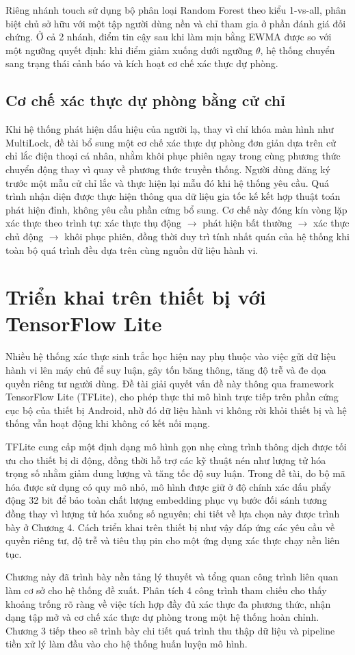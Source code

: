 \documentclass[../DoAn.tex]{subfiles}
\begin{document}
Riêng nhánh touch sử dụng bộ phân loại Random Forest theo kiểu 1-vs-all, phân biệt chủ sở hữu với một tập người dùng nền và chỉ tham gia ở phần đánh giá đối chứng. Ở cả 2 nhánh, điểm tin cậy sau khi làm mịn bằng EWMA được so với một ngưỡng quyết định: khi điểm giảm xuống dưới ngưỡng $\theta$, hệ thống chuyển sang trạng thái cảnh báo và kích hoạt cơ chế xác thực dự phòng.

\subsection{Cơ chế xác thực dự phòng bằng cử chỉ}

Khi hệ thống phát hiện dấu hiệu của người lạ, thay vì chỉ khóa màn hình như MultiLock, đề tài bổ sung một cơ chế xác thực dự phòng đơn giản dựa trên cử chỉ lắc điện thoại cá nhân, nhằm khôi phục phiên ngay trong cùng phương thức chuyển động thay vì quay về phương thức truyền thống. Người dùng đăng ký trước một mẫu cử chỉ lắc và thực hiện lại mẫu đó khi hệ thống yêu cầu. Quá trình nhận diện được thực hiện thông qua dữ liệu gia tốc kế kết hợp thuật toán phát hiện đỉnh, không yêu cầu phần cứng bổ sung. Cơ chế này đóng kín vòng lặp xác thực theo trình tự: xác thực thụ động $\rightarrow$ phát hiện bất thường $\rightarrow$ xác thực chủ động $\rightarrow$ khôi phục phiên, đồng thời duy trì tính nhất quán của hệ thống khi toàn bộ quá trình đều dựa trên cùng nguồn dữ liệu hành vi.

\section{Triển khai trên thiết bị với TensorFlow Lite}
\label{sec:tflite}

Nhiều hệ thống xác thực sinh trắc học hiện nay phụ thuộc vào việc gửi dữ liệu hành vi lên máy chủ để suy luận, gây tốn băng thông, tăng độ trễ và đe dọa quyền riêng tư người dùng. Đề tài giải quyết vấn đề này thông qua framework TensorFlow Lite (TFLite), cho phép thực thi mô hình trực tiếp trên phần cứng cục bộ của thiết bị Android, nhờ đó dữ liệu hành vi không rời khỏi thiết bị và hệ thống vẫn hoạt động khi không có kết nối mạng.

TFLite cung cấp một định dạng mô hình gọn nhẹ cùng trình thông dịch được tối ưu cho thiết bị di động, đồng thời hỗ trợ các kỹ thuật nén như lượng tử hóa trọng số nhằm giảm dung lượng và tăng tốc độ suy luận. Trong đề tài, do bộ mã hóa được sử dụng có quy mô nhỏ, mô hình được giữ ở độ chính xác dấu phẩy động 32 bit để bảo toàn chất lượng embedding phục vụ bước đối sánh tương đồng thay vì lượng tử hóa xuống số nguyên; chi tiết về lựa chọn này được trình bày ở Chương 4. Cách triển khai trên thiết bị như vậy đáp ứng các yêu cầu về quyền riêng tư, độ trễ và tiêu thụ pin cho một ứng dụng xác thực chạy nền liên tục.

Chương này đã trình bày nền tảng lý thuyết và tổng quan công trình liên quan làm cơ sở cho hệ thống đề xuất. Phân tích 4 công trình tham chiếu cho thấy khoảng trống rõ ràng về việc tích hợp đầy đủ xác thực đa phương thức, nhận dạng tập mở và cơ chế xác thực dự phòng trong một hệ thống hoàn chỉnh. Chương 3 tiếp theo sẽ trình bày chi tiết quá trình thu thập dữ liệu và pipeline tiền xử lý làm đầu vào cho hệ thống huấn luyện mô hình.
\end{document}
